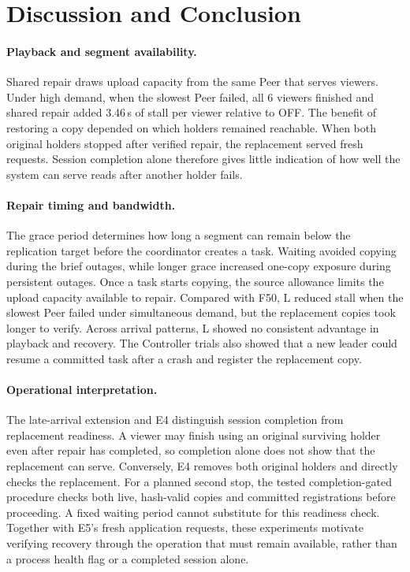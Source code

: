 \section{Discussion and Conclusion}

\paragraph{Playback and segment availability.}
Shared repair draws upload capacity from the same Peer that serves
viewers. Under high demand, when the slowest Peer failed, all 6 viewers
finished and shared repair added 3.46\,s of stall per viewer relative to
OFF. The benefit of restoring a copy depended on which holders remained
reachable. When both original
holders stopped after verified repair, the replacement served fresh
requests. Session completion alone therefore gives little indication of
how well the system can serve reads after another holder fails.

\paragraph{Repair timing and bandwidth.}
The grace period determines how long a segment can remain below the
replication target before the coordinator creates a task. Waiting avoided
copying during the brief outages, while longer grace increased one-copy
exposure during persistent outages. Once a task starts copying, the
source allowance limits the upload capacity available to repair.
Compared with F50, L reduced stall when the slowest Peer failed under
simultaneous demand, but the replacement copies took longer to verify.
Across arrival patterns, L showed no consistent advantage in playback
and recovery. The Controller trials also showed that a new leader could
resume a committed task after a crash and register the replacement copy.

\paragraph{Operational interpretation.}
The late-arrival extension and E4 distinguish session completion from
replacement readiness. A viewer may finish using an original surviving
holder even after repair has completed, so completion alone does not show
that the replacement can serve. Conversely, E4 removes both original
holders and directly checks the replacement. For a planned second stop,
the tested completion-gated procedure checks both live, hash-valid copies
and committed registrations before proceeding. A fixed waiting period
cannot substitute for this readiness check. Together with E5's fresh
application requests, these experiments motivate verifying recovery
through the operation that must remain available, rather than a process
health flag or a completed session alone.

